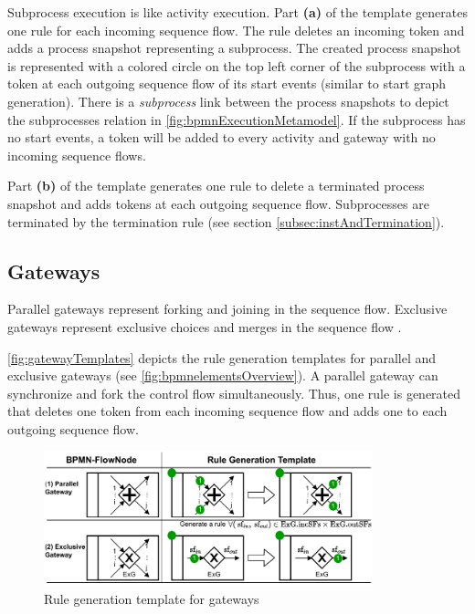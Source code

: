 \documentclass{lmcs} %
\begin{document}
Subprocess execution is like activity execution.
Part \textbf{(a)} of the template generates one rule for each incoming sequence flow.
The rule deletes an incoming token and adds a process snapshot representing a subprocess. 
The created process snapshot is represented with a colored circle on the top left corner of the subprocess with a token at each outgoing sequence flow of its start events (similar to start graph generation).
There is a \textit{subprocess} link between the process snapshots to depict the \textsf{subprocesses} relation in \autoref{fig:bpmnExecutionMetamodel}.
If the subprocess has no start events, a token will be added to every activity and gateway with no incoming sequence flows.

Part \textbf{(b)} of the template generates one rule to delete a terminated process snapshot and adds tokens at each outgoing sequence flow.
Subprocesses are terminated by the termination rule (see section \ref{subsec:instAndTermination}).

\subsection{Gateways}
Parallel gateways represent forking and joining in the sequence flow.
Exclusive gateways represent exclusive choices and merges in the sequence flow \cite{objectmanagementgroupBusinessProcessModel2013}.


\autoref{fig:gatewayTemplates} depicts the rule generation templates for parallel and exclusive gateways (see \autoref{fig:bpmnelementsOverview}).
A parallel gateway can synchronize and fork the control flow simultaneously.
Thus, one rule is generated that deletes one token from each incoming sequence flow and adds one to each outgoing sequence flow.

\begin{figure}[ht]
    \centering
    \includegraphics[width=0.85\textwidth]{images/gateways_template.pdf}
    \caption{Rule generation template for gateways}
    \label{fig:gatewayTemplates}
\end{figure}
\end{document}
